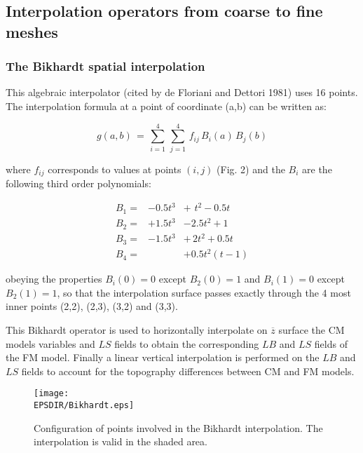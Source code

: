 \subsection{Interpolation operators from coarse to fine meshes}

\subsubsection{The Bikhardt spatial interpolation}

 This algebraic interpolator (cited by de Floriani and Dettori 1981)
uses 16 points.
The interpolation formula at a point of coordinate (a,b) can be
written as:

\begin{equation}
\label{Bik0}
g(a,b) \, =  \, \sum_{i=1}^4  \, \sum_{j=1}^4  \,
f_{ij} \,B_{i}(a) \,B_{j}(b)
\end{equation}

\noindent where $f_{ij}$ corresponds to values at points $(i,j)$
(Fig. 2) and the $B_{i}$ are the following third order polynomials:

\vspace{-.3cm}
\begin{eqnarray}
B_{1} = &-0.5 t^3 & + \,\,t^2 -0.5t   \nonumber \\
B_{2} = &+1.5 t^3 & - 2.5 t^2 +1 \\
B_{3} = &-1.5 t^3 & + \,2 t^2 +0.5t   \nonumber \\
B_{4} = &         & + 0.5 t^2 (t-1)   \nonumber
\end{eqnarray}

\noindent obeying the properties $B_{i}(0)=0$ except $B_{2}(0)=1$
and $B_{i}(1)=0$ except $B_{2}(1)=1$, so that the interpolation surface
passes exactly through the 4 most inner points (2,2), (2,3), (3,2) and (3,3).

 This Bikhardt operator is used to horizontally interpolate on
$\overline{z}$ surface the CM models variables and $LS$ fields to obtain the
corresponding $LB$ and $LS$ fields of the FM model. Finally a linear vertical
interpolation is performed on the $LB$ and $LS$ fields to account for the
topography  differences between CM and FM models.

\begin{figure}[!ht]
\centerline{\texttt{[image: \\EPSDIR/Bikhardt.eps]}}
\caption{Configuration of points involved in the Bikhardt interpolation.
The interpolation is valid in the shaded area.}
\end{figure}

